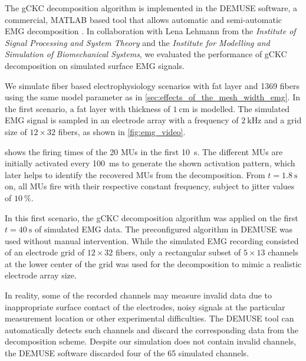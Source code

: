 The gCKC decomposition algorithm is implemented in the DEMUSE software, a commercial, MATLAB based tool that allows automatic and semi-automatic EMG decomposition \cite{demuse}. In collaboration with Lena Lehmann from the \emph{Institute of Signal Processing and System Theory} and the \emph{Institute for Modelling and Simulation of Biomechanical Systems}, we evaluated the performance of gCKC decomposition on simulated surface EMG signals.

We simulate fiber based electrophysiology scenarios with fat layer and 1369 fibers using the same model parameter as in \cref{sec:effects_of_the_mesh_width_emg}. In the first scenario, a fat layer with thickness of $\SI{1}{\cm}$ is modelled. The simulated EMG signal is sampled in an electrode array with a frequency of $\SI{2}{\kilo\hertz}$ and a grid size of $12 \times 32$ fibers, as shown in \cref{fig:emg_video}.

 shows the firing times of the 20 MUs in the first \SI{10}{\second}. The different MUs are initially activated every \SI{100}{\ms} to generate the shown  activation pattern, which later helps to identify the recovered MUs from the decomposition.  From $t=\SI{1.8}{\second}$ on, all MUs fire with their respective constant frequency, subject to jitter values of $\SI{10}{\percent}$.

In this first scenario, the gCKC decomposition algorithm was applied on the first $t=\SI{40}{\second}$ of simulated EMG data. The preconfigured algorithm in DEMUSE was used without manual intervention. While the simulated EMG recording consisted of an electrode grid of $12 \times 32$ fibers, only a rectangular subset of $5\times 13$ channels at the lower center of the grid was used for the decomposition to mimic a realistic electrode array size. 

In reality, some of the recorded channels may measure invalid data due to inappropriate surface contact of the electrodes, noisy signals at the particular measurement location or other experimental difficulties. The DEMUSE tool can automatically detects such channels and discard the corresponding data from the decomposition scheme. Despite our simulation does not contain invalid channels, the DEMUSE software discarded four of the 65 simulated channels.

